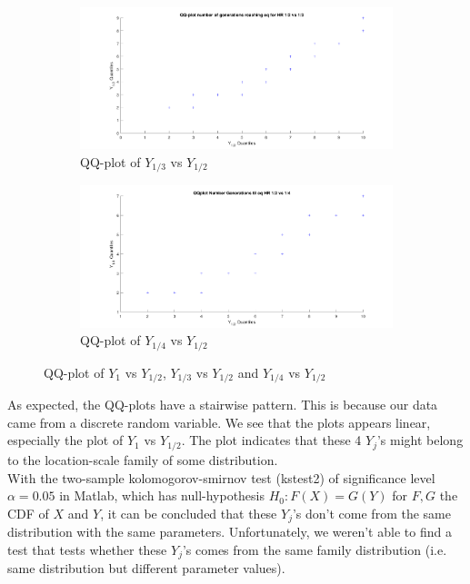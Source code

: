 \begin{figure}[H]
    \begin{subfigure}{0.8\textwidth}
    \includegraphics[width=\textwidth]{QQplotATGEN1.pdf}
    \caption{QQ-plot of $Y_{1/3}$ vs $Y_{1/2}$}
        \label{fig:QQplotATGEN1}
    \end{subfigure}
    \begin{subfigure}{0.8\textwidth}
    \includegraphics[width=\textwidth]{QQplotATGEN2.pdf}
    \caption{QQ-plot of $Y_{1/4}$ vs $Y_{1/2}$}
        \label{fig:QQplotATGEN2}
    \end{subfigure}
    \caption{QQ-plot of $Y_{1}$ vs $Y_{1/2}$, $Y_{1/3}$ vs $Y_{1/2}$ and $Y_{1/4}$ vs $Y_{1/2}$}
    \label{fig:QQ-plot}
\end{figure}

As expected, the QQ-plots have a stairwise pattern. 
This is because our data came from a discrete random variable. 
We see that the plots appears linear, especially the plot of $Y_{1}$ vs $Y_{1/2}$. 
The plot indicates that these 4 $Y_j$'s might belong to the location-scale family of some distribution.\\

With the two-sample kolomogorov-smirnov test (kstest2) of significance level $\alpha=0.05$ in Matlab, which has null-hypothesis $H_0:F(X)=G(Y)$ for $F,G$ the CDF of $X$ and $Y$, it can be concluded that these $Y_j$'s don't come from the same distribution with the same parameters. 
Unfortunately, we weren't able to find a test that tests whether these $Y_j$'s comes from the same family distribution (i.e. same distribution but different parameter values).\\




